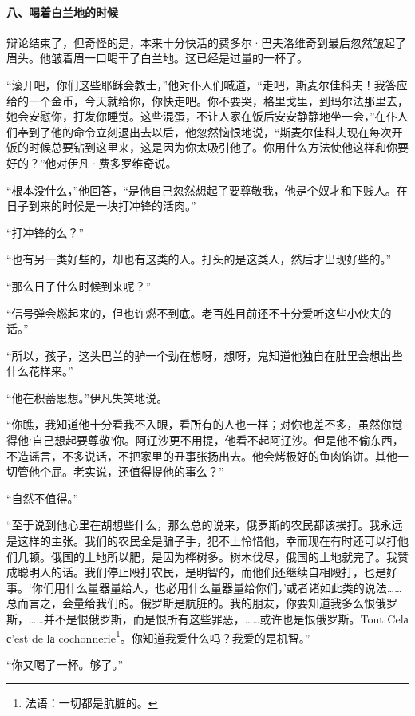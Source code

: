 \paragraph*{八、喝着白兰地的时候}
\par 辩论结束了，但奇怪的是，本来十分快活的费多尔·巴夫洛维奇到最后忽然皱起了眉头。他皱着眉一口喝干了白兰地。这已经是过量的一杯了。
\par “滚开吧，你们这些耶稣会教士，”他对仆人们喊道，“走吧，斯麦尔佳科夫！我答应给的一个金币，今天就给你，你快走吧。你不要哭，格里戈里，到玛尔法那里去，她会安慰你，打发你睡觉。这些混蛋，不让人家在饭后安安静静地坐一会，”在仆人们奉到了他的命令立刻退出去以后，他忽然恼恨地说，“斯麦尔佳科夫现在每次开饭的时候总要钻到这里来，这是因为你太吸引他了。你用什么方法使他这样和你要好的？”他对伊凡·费多罗维奇说。
\par “根本没什么，”他回答，“是他自己忽然想起了要尊敬我，他是个奴才和下贱人。在日子到来的时候是一块打冲锋的活肉。”
\par “打冲锋的么？”
\par “也有另一类好些的，却也有这类的人。打头的是这类人，然后才出现好些的。”
\par “那么日子什么时候到来呢？”
\par “信号弹会燃起来的，但也许燃不到底。老百姓目前还不十分爱听这些小伙夫的话。”
\par “所以，孩子，这头巴兰的驴一个劲在想呀，想呀，鬼知道他独自在肚里会想出些什么花样来。”
\par “他在积蓄思想。”伊凡失笑地说。
\par “你瞧，我知道他十分看我不入眼，看所有的人也一样；对你也差不多，虽然你觉得他‘自己想起要尊敬’你。阿辽沙更不用提，他看不起阿辽沙。但是他不偷东西，不造谣言，不多说话，不把家里的丑事张扬出去。他会烤极好的鱼肉馅饼。其他一切管他个屁。老实说，还值得提他的事么？”
\par “自然不值得。”
\par “至于说到他心里在胡想些什么，那么总的说来，俄罗斯的农民都该挨打。我永远是这样的主张。我们的农民全是骗子手，犯不上怜惜他，幸而现在有时还可以打他们几顿。俄国的土地所以肥，是因为桦树多。树木伐尽，俄国的土地就完了。我赞成聪明人的话。我们停止殴打农民，是明智的，而他们还继续自相殴打，也是好事。‘你们用什么量器量给人，也必用什么量器量给你们，’或者诸如此类的说法……总而言之，会量给我们的。俄罗斯是肮脏的。我的朋友，你要知道我多么恨俄罗斯，……并不是恨俄罗斯，而是恨所有这些罪恶，……或许也是恨俄罗斯。Tout Celа с’est de lа cochonnerie\footnote{法语：一切都是肮脏的。}。你知道我爱什么吗？我爱的是机智。”
\par “你又喝了一杯。够了。”
